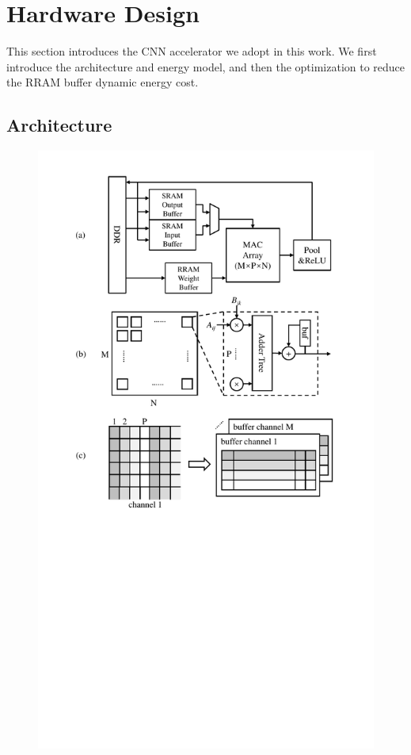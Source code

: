 \section{Hardware Design}\label{sec:hw}
This section introduces the CNN accelerator we adopt in this work. We first introduce the architecture and energy model, and then the optimization to reduce the RRAM buffer dynamic energy cost.

\subsection{Architecture}\label{sec:hw:arch}

\begin{figure}[t]
  \centering
  \includegraphics[width=1\columnwidth]{fig/arch.pdf}

\end{figure}
